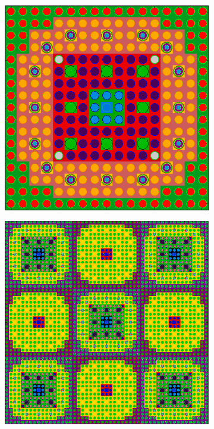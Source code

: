 \begin{figure}
\begin{subfigure}{.5\textwidth}
  \centering
  \includegraphics[width=.7\linewidth]{figures/workflow/opencg/unique-neighbor-cells-xy-24-16-assm}
  \caption{}
  \label{fig:assm-unique-neighbors}
\end{subfigure}
\begin{subfigure}{.5\textwidth}
  \centering
  \includegraphics[width=.7\linewidth]{figures/workflow/opencg/unique-neighbor-cells-xy-colorset}
  \caption{}
  \label{fig:colorset-unique-neighbors}
\end{subfigure}
\begin{subfigure}{.5\textwidth}
  \centering

\end{subfigure}
\end{figure}
